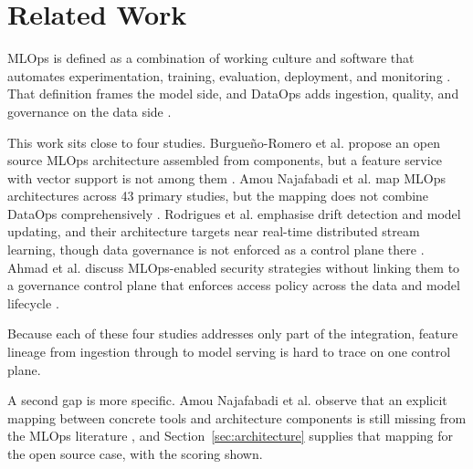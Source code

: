 
\section{Related Work}
\label{sec:related_work}

MLOps is defined as a combination of working culture and software that automates experimentation, training, evaluation, deployment, and monitoring \cite{kreuzberger2023mlops}. That definition frames the model side, and DataOps adds ingestion, quality, and governance on the data side \cite{munappy2020adhoc}.

This work sits close to four studies. Burgue\~{n}o-Romero et al. propose an open source MLOps architecture assembled from components, but a feature service with vector support is not among them \cite{burgueno2025toward}. Amou Najafabadi et al. map MLOps architectures across 43 primary studies, but the mapping does not combine DataOps comprehensively \cite{najafabadi2024analysis}. Rodrigues et al. emphasise drift detection and model updating, and their architecture targets near real-time distributed stream learning, though data governance is not enforced as a control plane there \cite{rodrigues2025architecture}. Ahmad et al. discuss MLOps-enabled security strategies without linking them to a governance control plane that enforces access policy across the data and model lifecycle \cite{ahmad2024mlops}.

Because each of these four studies addresses only part of the integration, feature lineage from ingestion through to model serving is hard to trace on one control plane.

A second gap is more specific. Amou Najafabadi et al. observe that an explicit mapping between concrete tools and architecture components is still missing from the MLOps literature \cite{najafabadi2024analysis}, and Section~\ref{sec:architecture} supplies that mapping for the open source case, with the scoring shown.
